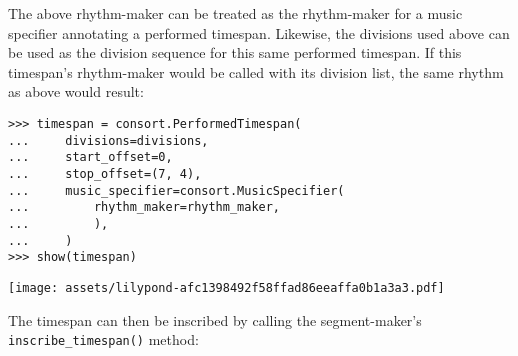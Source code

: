\noindent The above rhythm-maker can be treated as the rhythm-maker for a music
specifier annotating a performed timespan. Likewise, the divisions used above
can be used as the division sequence for this same performed timespan. If this
timespan's rhythm-maker would be called with its division list, the same rhythm
as above would result:

\begin{comment}
<abjad>
timespan = consort.PerformedTimespan(
    divisions=divisions,
    start_offset=0,
    stop_offset=(7, 4),
    music_specifier=consort.MusicSpecifier(
        rhythm_maker=rhythm_maker,
        ),
    )
show(timespan)
</abjad>
\end{comment}

\begin{abjadbookoutput}
\begin{singlespacing}
\vspace{-0.5\baselineskip}
\begin{lstlisting}
>>> timespan = consort.PerformedTimespan(
...     divisions=divisions,
...     start_offset=0,
...     stop_offset=(7, 4),
...     music_specifier=consort.MusicSpecifier(
...         rhythm_maker=rhythm_maker,
...         ),
...     )
>>> show(timespan)
\end{lstlisting}
\noindent\texttt{[image: assets/lilypond-afc1398492f58ffad86eeaffa0b1a3a3.pdf]}
\end{singlespacing}
\end{abjadbookoutput}

\noindent The timespan can then be inscribed by calling the segment-maker's
\texttt{inscribe\_timespan()} method:

\begin{comment}
<abjad>
inscribed_timespans = consort.SegmentMaker.inscribe_timespan(timespan)
show(inscribed_timespans, range_=(0, (7, 4)))
print(format(inscribed_timespans))
</abjad>
\end{comment}

